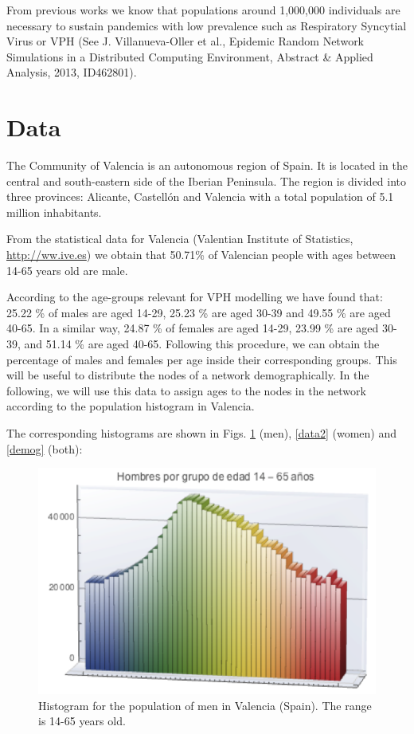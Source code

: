 From previous works we know that populations around 1,000,000 individuals are necessary to sustain pandemics with low prevalence such as Respiratory Syncytial Virus or VPH (See J. Villanueva-Oller et al., Epidemic Random Network Simulations in a Distributed Computing Environment, Abstract \& Applied Analysis, 2013, ID462801). 

\section{Data}
The Community of Valencia is an autonomous region of Spain. It is located in the central and south-eastern side of the Iberian Peninsula. The region is divided into three provinces: Alicante, Castell\'on and Valencia with a total population of 5.1 million inhabitants.

From the statistical data for Valencia (Valentian Institute of Statistics, \url{http://ww.ive.es}) we obtain that 50.71\% of Valencian people with ages between 14-65 years old are male. 

According to the age-groups relevant for VPH modelling we have found that: 25.22 \% of males are aged 14-29, 25.23 \% are aged 30-39 and 49.55 \% are aged 40-65. In a similar way, 24.87 \% of females are aged 14-29, 23.99 \% are aged 30-39, and 51.14 \% are aged 40-65. Following this procedure, we can obtain the percentage of males and females per age inside their corresponding groups. This will be useful to distribute the nodes of a network demographically. In the following, we will use this data to assign ages to the nodes in the network according to the population histogram in Valencia.

The corresponding histograms are shown in Figs. \ref{data1} (men), \ref{data2} (women) and \ref{demog} (both):

\begin{figure}[ht]
	\centering
	\includegraphics[scale=0.7]{IMG/data1.png}
	\caption{Histogram for the population of men in Valencia (Spain). The range is 14-65 years old.}
	\label{data1}
\end{figure} 

